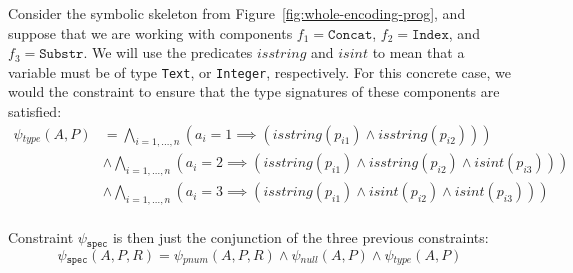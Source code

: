 \begin{example}
  Consider the symbolic skeleton from Figure~\ref{fig:whole-encoding-prog}, and
  suppose that we are working with components
  $f_1 = \mathtt{Concat}$, $f_2 = \mathtt{Index}$, and $f_3 = \mathtt{Substr}$.
  We will use the predicates $isstring$ and $isint$ to mean that a variable must
  be of type \lstinline{Text}, or \lstinline{Integer}, respectively.
  For this concrete case, we would the constraint to ensure that the type
  signatures of these components are satisfied:
  \begin{align*}
    \psi{}_{type}(A, P)
    &= \bigwedge_{i=1,\ldots,n}
      (a_i = 1 \implies (isstring(p_{i1}) \wedge isstring(p_{i2}))) \\
    &\wedge \bigwedge_{i=1,\ldots,n}
      (a_i = 2 \implies (isstring(p_{i1}) \wedge isstring(p_{i2}) \wedge isint(p_{i3}))) \\
    &\wedge \bigwedge_{i=1,\ldots,n}
      (a_i = 3 \implies (isstring(p_{i1}) \wedge isint(p_{i2}) \wedge isint(p_{i3}))) \\
  \end{align*}
\end{example}

\noindent
Constraint $\psi{}_{\mathtt{spec}}$ is then just the conjunction of the three
previous constraints:
%
\[
  \psi{}_{\mathtt{spec}}(A, P, R) =
  \psi{}_{pnum}(A, P, R) \wedge \psi{}_{null}(A, P) \wedge \psi{}_{type}(A, P)
\]

